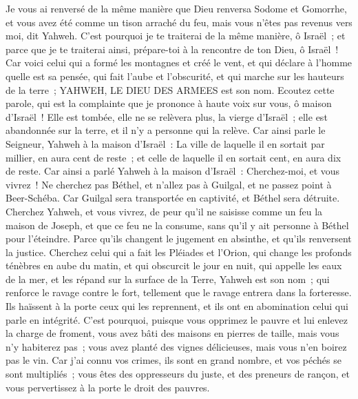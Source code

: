 \begin{multicols}{2}
Je vous ai renversé de la même manière que Dieu renversa Sodome et Gomorrhe, et vous avez été comme un tison arraché du feu, mais vous n'êtes pas revenus vers moi, dit Yahweh.
C'est pourquoi je te traiterai de la même manière, ô Israël~; et parce que je te traiterai ainsi, prépare-toi à la rencontre de ton Dieu, ô Israël~!
Car voici celui qui a formé les montagnes et créé le vent, et qui déclare à l'homme quelle est sa pensée, qui fait l'aube et l'obscurité, et qui marche sur les hauteurs de la terre~; YAHWEH, LE DIEU DES ARMEES est son nom.
\VerseOne{}Ecoutez cette parole, qui est la complainte que je prononce à haute voix sur vous, ô maison d'Israël~!
Elle est tombée, elle ne se relèvera plus, la vierge d'Israël~; elle est abandonnée sur la terre, et il n'y a personne qui la relève.
Car ainsi parle le Seigneur, Yahweh à la maison d'Israël~: La ville de laquelle il en sortait par millier, en aura cent de reste~; et celle de laquelle il en sortait cent, en aura dix de reste.
Car ainsi a parlé Yahweh à la maison d'Israël~: Cherchez-moi, et vous vivrez~!
Ne cherchez pas Béthel, et n'allez pas à Guilgal, et ne passez point à Beer-Schéba. Car Guilgal sera transportée en captivité, et Béthel sera détruite.
Cherchez Yahweh, et vous vivrez, de peur qu'il ne saisisse comme un feu la maison de Joseph, et que ce feu ne la consume, sans qu'il y ait personne à Béthel pour l'éteindre.
Parce qu'ils changent le jugement en absinthe, et qu'ils renversent la justice.
Cherchez celui qui a fait les Pléiades et l'Orion, qui change les profonds ténèbres en aube du matin, et qui obscurcit le jour en nuit, qui appelle les eaux de la mer, et les répand sur la surface de la Terre, Yahweh est son nom~;
qui renforce le ravage contre le fort, tellement que le ravage entrera dans la forteresse.
Ils haïssent à la porte ceux qui les reprennent, et ils ont en abomination celui qui parle en intégrité.
C'est pourquoi, puisque vous opprimez le pauvre et lui enlevez la charge de froment, vous avez bâti des maisons en pierres de taille, mais vous n'y habiterez pas~; vous avez planté des vignes délicieuses, mais vous n'en boirez pas le vin.
Car j'ai connu vos crimes, ils sont en grand nombre, et vos péchés se sont multipliés~; vous êtes des oppresseurs du juste, et des preneurs de rançon, et vous pervertissez à la porte le droit des pauvres. 

\end{multicols}
